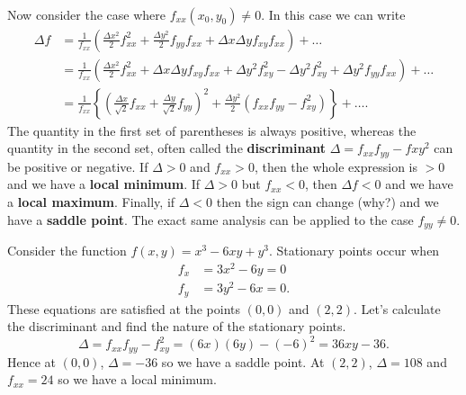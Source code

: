 \documentclass[../multivariate_calculus.tex]{subfiles}
\begin{document}
        \paragraph{}
        Now consider the case where $f_{xx}(x_0,y_0)\neq0$.
        In this case we can write
        \begin{align}
            \Delta f&=\frac{1}{f_{xx}}\left(\frac{\Delta x^2}{2}f_{xx}^2+\frac{\Delta y^2}{2}f_{yy}f_{xx}+\Delta x\Delta yf_{xy}f_{xx}\right)+\dots\\
            &=\frac{1}{f_{xx}}\left(\frac{\Delta x^2}{2}f_{xx}^2+\Delta x\Delta yf_{xy}f_{xx}+\Delta y^2f_{xy}^2-\Delta y^2f_{xy}^2+\Delta y^2f_{yy}f_{xx}\right)+\dots\\
            &=\frac{1}{f_{xx}}\left\{\left(\frac{\Delta x}{\sqrt{2}}f_{xx}+\frac{\Delta y}{\sqrt{2}}f_{yy}\right)^2+\frac{\Delta y^2}{2}(f_{xx}f_{yy}-f_{xy}^2)\right\}+\dots.
        \end{align}
        The quantity in the first set of parentheses is always positive, whereas the quantity in the second set, often called the \textbf{discriminant} $\Delta=f_{xx}f_{yy}-f{xy}^2$ can be positive or negative.
        If $\Delta>0$ and $f_{xx}>0$, then the whole expression is $>0$ and we have a \textbf{local minimum}.
        If $\Delta>0$ but $f_{xx}<0$, then $\Delta f<0$ and we have a \textbf{local maximum}.
        Finally, if $\Delta<0$ then the sign can change (why?) and we have a \textbf{saddle point}.
        The exact same analysis can be applied to the case $f_{yy}\neq0$.
        \begin{example}
            Consider the function $f(x,y)=x^3-6xy+y^3$.
            Stationary points occur when
            \begin{align}
                f_x&=3x^2-6y=0\\
                f_y&=3y^2-6x=0.
            \end{align}
            These equations are satisfied at the points $(0,0)$ and $(2,2)$.
            Let's calculate the discriminant and find the nature of the stationary points.
            \begin{equation}
                \Delta=f_{xx}f_{yy}-f_{xy}^2=(6x)(6y)-(-6)^2=36xy-36.
            \end{equation}
            Hence at $(0,0)$, $\Delta=-36$ so we have a saddle point.
            At $(2,2)$, $\Delta=108$ and $f_{xx}=24$ so we have a local minimum.
        \end{example}
\end{document}

